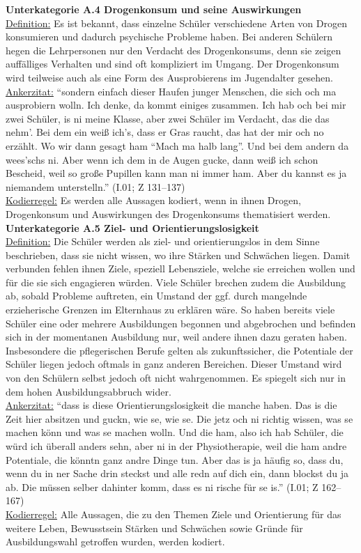 \textbf{Unterkategorie A.4 Drogenkonsum und seine Auswirkungen}\\
\underline{Definition:} Es ist bekannt, dass einzelne Schüler verschiedene Arten von Drogen konsumieren und dadurch psychische Probleme haben. Bei anderen Schülern hegen die Lehrpersonen nur den Verdacht des Drogenkonsums, denn sie zeigen auffälliges Verhalten und sind oft kompliziert im Umgang. Der Drogenkonsum wird teilweise auch als eine Form des Ausprobierens im Jugendalter gesehen.\\
\underline{Ankerzitat:} "`sondern einfach dieser Haufen junger Menschen, die sich och ma ausprobiern wolln. Ich denke, da kommt einiges zusammen. Ich hab och bei mir zwei Schüler, is ni meine Klasse, aber zwei Schüler im Verdacht, das die das nehm'. Bei dem ein weiß ich's, dass er Gras raucht, das hat der mir och no erzählt. Wo wir dann gesagt ham "`Mach ma halb lang"'. Und bei dem andern da wees'schs ni. Aber wenn ich dem in de Augen gucke, dann weiß ich schon Bescheid, weil so große Pupillen kann man ni immer ham. Aber du kannst es ja niemandem unterstelln."' (I.01; Z 131--137)\\
\underline{Kodierregel:} Es werden alle Aussagen kodiert, wenn in ihnen Drogen, Drogenkonsum und Auswirkungen des Drogenkonsums thematisiert werden.\\

\textbf{Unterkategorie A.5 Ziel- und Orientierungslosigkeit}\\
\underline{Definition:} Die Schüler werden als ziel- und orientierungslos in dem Sinne beschrieben, dass sie nicht wissen, wo ihre Stärken und Schwächen liegen. Damit verbunden fehlen ihnen Ziele, speziell Lebensziele, welche sie erreichen wollen und für die sie sich engagieren würden. Viele Schüler brechen zudem die Ausbildung ab, sobald Probleme auftreten, ein Umstand der ggf. durch mangelnde erzieherische Grenzen im Elternhaus zu erklären wäre. So haben bereits viele Schüler eine oder mehrere Ausbildungen begonnen und abgebrochen und befinden sich in der momentanen Ausbildung nur, weil andere ihnen dazu geraten haben. Insbesondere die pflegerischen Berufe gelten als zukunftssicher, die Potentiale der Schüler liegen jedoch oftmals in ganz anderen Bereichen. Dieser Umstand wird von den Schülern selbst jedoch oft nicht wahrgenommen. Es spiegelt sich nur in dem hohen Ausbildungsabbruch wider.\\
\underline{Ankerzitat:} "`dass is diese Orientierungslosigkeit die manche haben. Das is die Zeit hier absitzen und guckn, wie se, wie se. Die jetz och ni richtig wissen, was se machen könn und was se machen wolln. Und die ham, also ich hab Schüler, die würd ich überall anders sehn, aber ni in der Physiotherapie, weil die ham andre Potentiale, die könntn ganz andre Dinge tun. Aber das is ja häufig so, dass du, wenn du in ner Sache drin steckst und alle redn auf dich ein, dann blockst du ja ab. Die müssen selber dahinter komm, dass es ni rische für se is."' (I.01; Z 162--167)\\
\underline{Kodierregel:} Alle Aussagen, die zu den Themen Ziele und Orientierung für das weitere Leben, Bewusstsein Stärken und Schwächen sowie Gründe für Ausbildungswahl getroffen wurden, werden kodiert. \\

